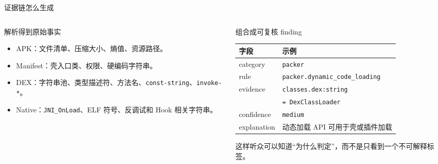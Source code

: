 \documentclass[10pt,aspectratio=169]{beamer}
\begin{document}
\begin{frame}{证据链怎么生成}
  \begin{columns}[T,totalwidth=\textwidth]
    \begin{column}{0.46\textwidth}
      \begin{block}{解析得到原始事实}
        \begin{itemize}
          \item APK：文件清单、压缩大小、熵值、资源路径。
          \item Manifest：壳入口类、权限、硬编码字符串。
          \item DEX：字符串池、类型描述符、方法名、\texttt{const-string}、\texttt{invoke-*}。
          \item Native：\texttt{JNI\_OnLoad}、ELF 符号、反调试和 Hook 相关字符串。
        \end{itemize}
      \end{block}
    \end{column}
    \begin{column}{0.52\textwidth}
      \begin{block}{组合成可复核 finding}
        \scriptsize
        \begin{tabular}{p{1.55cm}p{4.35cm}}
          \toprule
          字段 & 示例 \\
          \midrule
          category & \texttt{packer} \\
          rule & \texttt{packer.dynamic\_code\_loading} \\
          evidence & \texttt{classes.dex:string}\\
                   & \texttt{= DexClassLoader} \\
          confidence & \texttt{medium} \\
          explanation & 动态加载 API 可用于壳或插件加载 \\
          \bottomrule
        \end{tabular}
      \end{block}
      \vspace{0.35em}
      这样听众可以知道“为什么判定”，而不是只看到一个不可解释标签。
    \end{column}
  \end{columns}
\end{frame}
\end{document}
